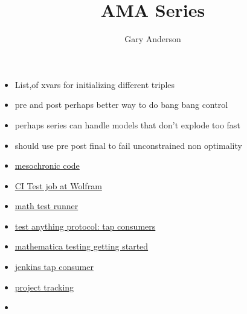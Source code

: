 \documentclass[hyperref]{labbook}
\begin{document}
\frontmatter
\title{AMA Series}
\author{Gary Anderson }
\maketitle

\printindex
\tableofcontents




\mainmatter



\begin{itemize}
\item List,of xvars for initializing different triples
\item pre and post perhaps better way to do bang bang control
\item perhaps series can handle models that don't explode too fast
\item should use pre post final to fail unconstrained non optimality
\end{itemize}

\begin{itemize}
\item \href{http://people.clarkson.edu/~mbudisic/software.html}{mesochronic code}
\end{itemize}

  \begin{itemize}
  \item \href{https://www.wolfram.com/company/careers/opportunities/#op-94325-software-developer-in-test}{CI Test job at Wolfram}
  \item \href{https://github.com/lynchs61/Mathematica-Test-Runner}{math test runner}
  \item \href{https://testanything.org/consumers.html}{test anything protocol: tap consumers}
  \item \href{http://reference.wolfram.com/language/tutorial/UsingTheTestingFramework.html}{mathematica testing getting started}
  \item \href{https://wiki.jenkins.io/display/JENKINS/TAP+Plugin}{jenkins tap consumer }
  \item \href{https://www.atlassian.com/software/jira}{project tracking}
  \end{itemize}



\begin{itemize}
\item 
\end{itemize}
\end{document}
